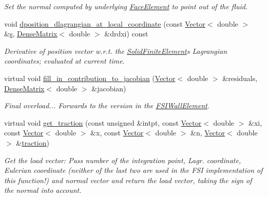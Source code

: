 \begin{DoxyCompactItemize}
\begin{DoxyCompactList}\small\item\em Set the normal computed by underlying \hyperlink{classoomph_1_1FaceElement}{Face\+Element} to point out of the fluid. \end{DoxyCompactList}\item 
void \hyperlink{classoomph_1_1FSISolidTractionElement_a65724c5eb73e1f82a0c8230e84f86144}{dposition\+\_\+dlagrangian\+\_\+at\+\_\+local\+\_\+coordinate} (const \hyperlink{classoomph_1_1Vector}{Vector}$<$ double $>$ \&\hyperlink{cfortran_8h_ab7123126e4885ef647dd9c6e3807a21c}{s}, \hyperlink{classoomph_1_1DenseMatrix}{Dense\+Matrix}$<$ double $>$ \&drdxi) const
\begin{DoxyCompactList}\small\item\em Derivative of position vector w.\+r.\+t. the \hyperlink{classoomph_1_1SolidFiniteElement}{Solid\+Finite\+Element}\textquotesingle{}s Lagrangian coordinates; evaluated at current time. \end{DoxyCompactList}\item 
virtual void \hyperlink{classoomph_1_1FSISolidTractionElement_a789bdb99ca30e3c7b56adab5be79a59d}{fill\+\_\+in\+\_\+contribution\+\_\+to\+\_\+jacobian} (\hyperlink{classoomph_1_1Vector}{Vector}$<$ double $>$ \&residuals, \hyperlink{classoomph_1_1DenseMatrix}{Dense\+Matrix}$<$ double $>$ \&jacobian)
\begin{DoxyCompactList}\small\item\em Final overload... Forwards to the version in the \hyperlink{classoomph_1_1FSIWallElement}{F\+S\+I\+Wall\+Element}. \end{DoxyCompactList}\item 
virtual void \hyperlink{classoomph_1_1FSISolidTractionElement_a861d9e1c8358c02f304e90c0d16a050d}{get\+\_\+traction} (const unsigned \&intpt, const \hyperlink{classoomph_1_1Vector}{Vector}$<$ double $>$ \&xi, const \hyperlink{classoomph_1_1Vector}{Vector}$<$ double $>$ \&x, const \hyperlink{classoomph_1_1Vector}{Vector}$<$ double $>$ \&n, \hyperlink{classoomph_1_1Vector}{Vector}$<$ double $>$ \&\hyperlink{classoomph_1_1SolidTractionElement_ab00a3429962eb33612054e82095f8082}{traction})
\begin{DoxyCompactList}\small\item\em Get the load vector\+: Pass number of the integration point, Lagr. coordinate, Eulerian coordinate (neither of the last two are used in the F\+SI implementation of this function!) and normal vector and return the load vector, taking the sign of the normal into account. \end{DoxyCompactList}\item 

\end{DoxyCompactItemize}
